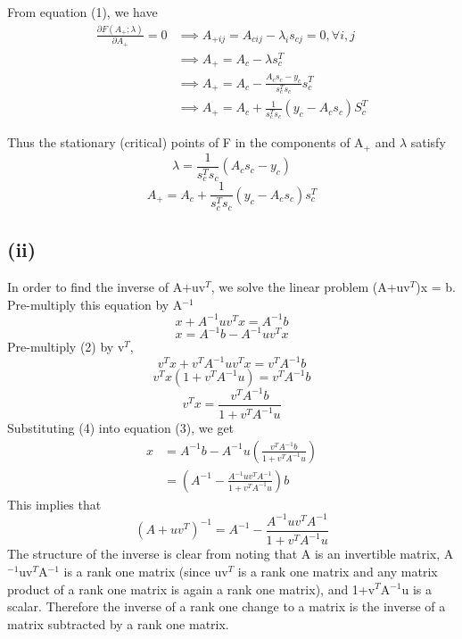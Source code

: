 \documentclass[11pt]{amsart}
\begin{document}
From equation (1), we have
\begin{align*}
\frac{\partial F(A_{+};\lambda)}{\partial A_{+}} = 0 &\implies A_{+ij} = A_{cij}-\lambda_{i}s_{cj} = 0, \forall i,j\\ &\implies A_{+} = A_{c} - \lambda s_{c}^{T}\\
&\implies A_{+} = A_{c} - \frac{A_{c}s_{c}-y_{c}}{s_{c}^{T}s_{c}} s_{c}^{T}\\
&\implies A_{+} = A_{c} + \frac{1}{s_{c}^{T}s_{c}} (y_{c}-A_{c}s_{c})S_{c}^{T}
\end{align*}

Thus the stationary (critical) points of F in the components of A$_{+}$ and $\lambda$ satisfy
\[
\lambda = \frac{1}{s_{c}^{T}s_{c}}(A_{c}s_{c}-y_{c})
\]
\[
A_{+} = A_{c} + \frac{1}{s_{c}^{T}s_{c}} (y_{c}-A_{c}s_{c})s_{c}^{T}
\]
\subsection*{(ii)}
In order to find the inverse of A+uv$^{T}$, we solve the linear problem (A+uv$^{T}$)x = b. Pre-multiply this equation by A$^{-1}$ 
\begin{equation}
x+A^{-1}uv^{T}x = A^{-1}b 
\end{equation}
\begin{equation}
x = A^{-1}b-A^{-1}uv^{T}x
\end{equation}
\newline
Pre-multiply (2) by v$^{T}$,
\[
v^{T}x + v^{T}A^{-1}uv^{T}x = v^{T}A^{-1}b
\]
\[
v^{T}x(1+v^{T}A^{-1}u) = v^{T}A^{-1}b
\]
\begin{equation}
v^{T}x = \frac{v^{T}A^{-1}b}{1+v^{T}A^{-1}u}
\end{equation}
\newline
Substituting (4) into equation (3), we get
\begin{align*}
x &= A^{-1}b-A^{-1}u(\frac{v^{T}A^{-1}b}{1+v^{T}A^{-1}u})\\
&= (A^{-1}-\frac{A^{-1}uv^{T}A^{-1}}{1+v^{T}A^{-1}u})b
\end{align*}
This implies that 
\[
(A+uv^{T})^{-1} =  A^{-1} - \frac{A^{-1}uv^{T}A^{-1}}{1+v^{T}A^{-1}u}
\]
\newline
The structure of the inverse is clear from noting that A is an invertible matrix, A$^{-1}$uv$^{T}$A$^{-1}$ is a rank one matrix (since uv$^{T}$ is a rank one matrix and any matrix product of a rank one matrix is again a rank one matrix), and 1+v$^{T}$A$^{-1}$u is a scalar. Therefore the inverse of a rank one change to a matrix is the inverse of a matrix subtracted by a rank one matrix.
\end{document}
